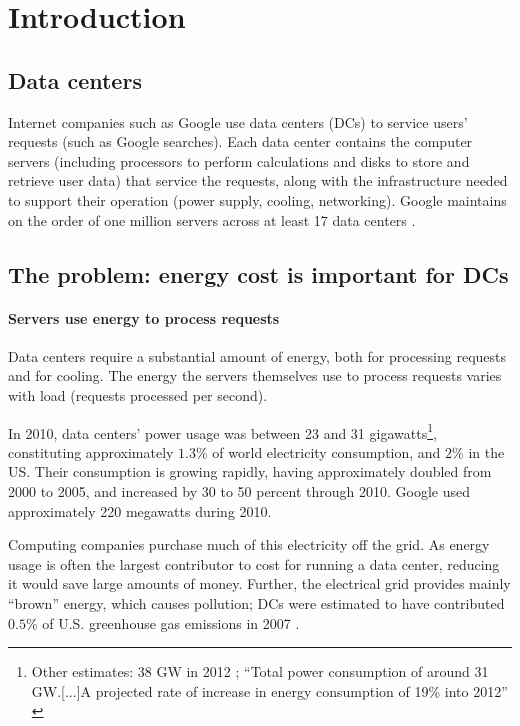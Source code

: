 \documentclass{acm_proc_article-sp}
\begin{document}
\section{Introduction}

\subsection{Data centers}
		Internet companies such as Google use data centers (DCs) to service users’ requests (such as Google searches). Each data center contains the computer servers (including processors to perform calculations and disks to store and retrieve user data) that service the requests, along with the infrastructure needed to support their operation (power supply, cooling, networking).
		Google maintains on the order of one million servers \cite{google900000} \cite{koomeyreport} across at least 17 data centers \cite{googlenumdcs}.
		
\subsection{The problem: energy cost is important for DCs}
		\paragraph{Servers use energy to process requests}
			Data centers require a substantial amount of energy, both for processing requests and for cooling. The energy the servers themselves use to process requests varies with load (requests processed per second).
			
			In 2010, data centers’ power usage was between 23 and 31 gigawatts\footnote{Other estimates: 38 GW in 2012 \cite{dc38GW}; “Total power consumption of around 31 GW.[...]A projected rate of increase in energy consumption of 19\% into 2012” \cite{dcd:energydemand}}, constituting approximately $1.3\%$ of world electricity consumption, and $2\%$ in the US. Their consumption is growing rapidly, having approximately doubled from 2000 to 2005, and increased by 30 to 50 percent through 2010. Google used approximately 220 megawatts during 2010. \cite{koomeyreport}
			
			Computing companies purchase much of this electricity off the grid. As energy usage is often the largest contributor to cost for running a data center, reducing it would save large amounts of money. Further, the electrical grid provides mainly “brown” energy, which causes pollution; DCs were estimated to have contributed $0.5\%$ of U.S. greenhouse gas emissions in 2007 \cite{wikipedia:dcgreenhouse}.
		
\end{document}
